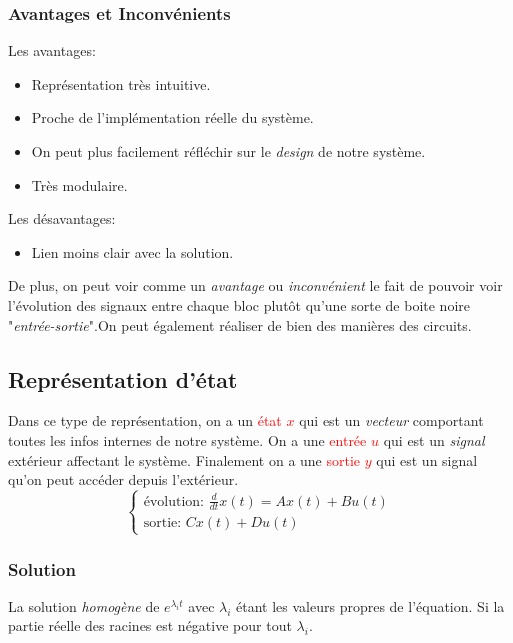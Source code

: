 \documentclass{report}
\begin{document}
\subsubsection{Avantages et Inconvénients}
Les avantages:
\begin{itemize}
	\item Représentation très intuitive.
	\item Proche de l'implémentation réelle du système.
	\item On peut plus facilement réfléchir sur le \textit{design} de notre système.
	\item Très modulaire.
\end{itemize}
Les désavantages:
\begin{itemize}
	\item Lien moins clair avec la solution.
\end{itemize}
De plus, on peut voir comme un \textit{avantage} ou \textit{inconvénient} le fait de pouvoir voir l'évolution des signaux entre chaque bloc plutôt qu'une sorte de boite noire "\textit{entrée-sortie}".On peut également réaliser de bien des manières des circuits.

\subsection{Représentation d'état}
Dans ce type de représentation, on a un \textcolor{red}{état $x$} qui est un \textit{vecteur} comportant toutes les infos internes de notre système. On a une  \textcolor{red}{entrée $u$} qui est un \textit{signal} extérieur affectant le système. Finalement on a une \textcolor{red}{sortie $y$} qui est un signal qu'on peut accéder depuis l'extérieur.\\
\begin{equation}
\begin{cases}
\text{évolution: }\frac{d}{dt}x(t) =  Ax(t) + Bu(t)\\
\text{sortie: } C x(t) + D u(t)
\end{cases}
\end{equation}

\subsubsection{Solution}
La solution \textit{homogène} de $e^{\lambda_it}$ avec $\lambda_i$ étant les valeurs propres de l'équation. Si la partie réelle des racines est négative pour tout $\lambda_i$.
\end{document}
